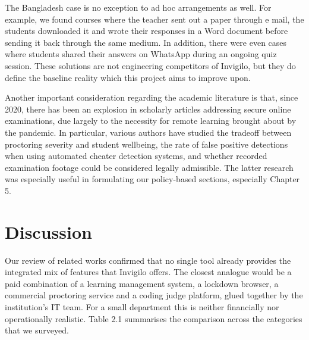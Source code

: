 \documentclass[12pt, a4paper]{report}
\begin{document}
\begin{justify}
{    The Bangladesh case is no exception to ad hoc arrangements as well. For example, we found courses where the teacher sent out a paper through e mail, the students downloaded it and wrote their responses in a Word document before sending it back through the same medium. In addition, there were even cases where students shared their answers on WhatsApp during an ongoing quiz session. These solutions are not engineering competitors of Invigilo, but they do define the baseline reality which this project aims to improve upon.

    Another important consideration regarding the academic literature is that, since 2020, there has been an explosion in scholarly articles addressing secure online examinations, due largely to the necessity for remote learning brought about by the pandemic. In particular, various authors have studied the tradeoff between proctoring severity and student wellbeing, the rate of false positive detections when using automated cheater detection systems, and whether recorded examination footage could be considered legally admissible. The latter research was especially useful in formulating our policy-based sections, especially Chapter 5.
  }
\end{justify}

\section{Discussion}

\begin{justify}
  {\fontsize{12}{18}\selectfont
    Our review of related works confirmed that no single tool already provides the integrated mix of features that Invigilo offers. The closest analogue would be a paid combination of a learning management system, a lockdown browser, a commercial proctoring service and a coding judge platform, glued together by the institution's IT team. For a small department this is neither financially nor operationally realistic. Table 2.1 summarises the comparison across the categories that we surveyed.
  }
\end{justify}
\end{document}

